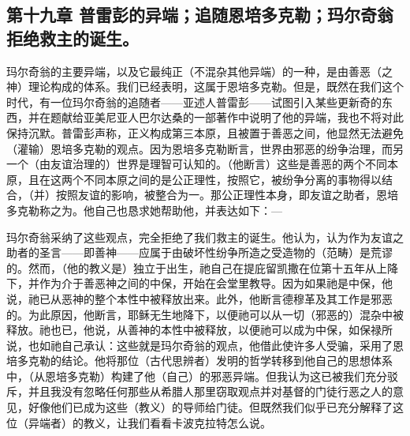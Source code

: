 \subsection{第十九章 普雷彭的异端；追随恩培多克勒；玛尔奇翁拒绝救主的诞生。}

玛尔奇翁的主要异端，以及它最纯正（不混杂其他异端）的一种，是由善恶（之神）理论构成的体系。我们已经表明，这属于恩培多克勒。但是，既然在我们这个时代，有一位玛尔奇翁的追随者——亚述人普雷彭——试图引入某些更新奇的东西，并在题献给亚美尼亚人巴尔达桑的一部著作中说明了他的异端，我也不将对此保持沉默。普雷彭声称，正义构成第三本原，且被置于善恶之间，他显然无法避免（灌输）恩培多克勒的观点。因为恩培多克勒断言，世界由邪恶的纷争治理，而另一个（由友谊治理的）世界是理智可认知的。（他断言）这些是善恶的两个不同本原，且在这两个不同本原之间的是公正理性，按照它，被纷争分离的事物得以结合，（并）按照友谊的影响，被整合为一。那公正理性本身，即友谊之助者，恩培多克勒称之为。他自己也恳求她帮助他，并表达如下：—\par

\par

玛尔奇翁采纳了这些观点，完全拒绝了我们救主的诞生。他认为，认为作为友谊之助者的圣言——即善神——应属于由破坏性纷争所造之受造物的（范畴）是荒谬的。然而，（他的教义是）独立于出生，祂自己在提庇留凯撒在位第十五年从上降下，并作为介于善恶神之间的中保，开始在会堂里教导。因为如果祂是中保，他说，祂已从恶神的整个本性中被释放出来。此外，他断言德穆革及其工作是邪恶的。为此原因，他断言，耶稣无生地降下，以便祂可以从一切（邪恶的）混杂中被释放。祂也已，他说，从善神的本性中被释放，以便祂可以成为中保，如保禄所说，也如祂自己承认：这些就是玛尔奇翁的观点，他借此使许多人受骗，采用了恩培多克勒的结论。他将那位（古代思辨者）发明的哲学转移到他自己的思想体系中，（从恩培多克勒）构建了他（自己）的邪恶异端。但我认为这已被我们充分驳斥，并且我没有忽略任何那些从希腊人那里窃取观点并对基督的门徒行恶之人的意见，好像他们已成为这些（教义）的导师给门徒。但既然我们似乎已充分解释了这位（异端者）的教义，让我们看看卡波克拉特怎么说。\par



